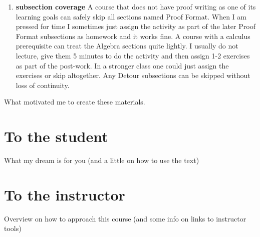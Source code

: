 \begin{enumerate}
   \item \textbf{subsection coverage}  A course that does not have proof writing as one of its learning goals can safely skip all sections named Proof Format. When I am pressed for time I sometimes just assign the activity as part of the later Proof Format subsections as homework and it works fine. A course with a calculus prerequisite can treat the Algebra sections quite lightly.  I usually do not lecture, give them 5 minutes to do the activity and then assign 1-2 exercises as part of the post-work.  In a stronger class one could just assign the exercises or skip altogether.  Any Detour subsections can be skipped without loss of continuity.

\end{enumerate}



What motivated me to create these materials.


\section*{To the student}

What my dream is for you (and a little on how to use the text)


\section*{To the instructor}

Overview on how to approach this course (and some info on links to instructor tools)

%
%

